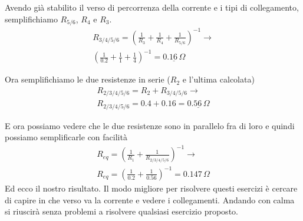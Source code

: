 \begin{center}
\end{center}
Avendo già stabilito il verso di percorrenza della corrente e i tipi di collegamento, semplifichiamo
$R_{5/6}$, $R_4$ e $R_3$.
\begin{align*}
  R_{3/4/5/6} = \left(\frac{1}{R_3} + \frac{1}{R_4} + \frac{1}{R_{5/6}}\right)^{-1} \rightarrow\\
  \left(\frac{1}{0.2} + \frac{1}{1} + \frac{1}{4}\right)^{-1} = \underline{0.16\,\Omega}
\end{align*}

\begin{center}
\end{center}
Ora semplifichiamo le due resistenze in serie ($R_2$ e l'ultima calcolata)
\begin{align*}
  R_{2/3/4/5/6} = R_2 + R_{3/4/5/6} \rightarrow \\
  R_{2/3/4/5/6} = 0.4 + 0.16 = \underline{0.56\,\Omega}
\end{align*}

\begin{center}
\end{center}
E ora possiamo vedere che le due resistenze sono in parallelo fra di loro e quindi possiamo
semplificarle con facilità
\begin{align*}
  R_{eq} = \left(\frac{1}{R_1} + \frac{1}{R_{2/3/4/5/6}}\right)^{-1} \rightarrow\\
  R_{eq} = \left(\frac{1}{0.2} + \frac{1}{0.56}\right)^{-1} = \boxed{0.147\,\Omega}
\end{align*}
Ed ecco il nostro risultato. Il modo migliore per risolvere questi esercizi è cercare di capire
in che verso va la corrente e vedere i collegamenti. Andando con calma si riuscirà senza problemi a 
risolvere qualsiasi esercizio proposto.

